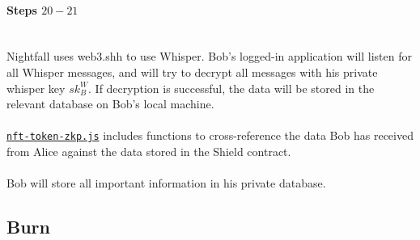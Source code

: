 \documentclass{article}
\begin{document}
\paragraph{Steps $20 - 21$}
\ \\
Nightfall uses web3.shh to use Whisper. Bob's logged-in application will listen for all Whisper messages, and will try to decrypt all messages with his private whisper key $sk^W_B$. If decryption is successful, the data will be stored in the relevant database on Bob's local machine.\\
\\
\hyperref[sec:nf-token-zkp]{\texttt{nft-token-zkp.js}} includes functions to cross-reference the data Bob has received from Alice against the data stored in the Shield contract.\\
\\
Bob will store all important information in his private database.















\newpage

\subsection{Burn}
\label{sec:721Burn}
\end{document}
